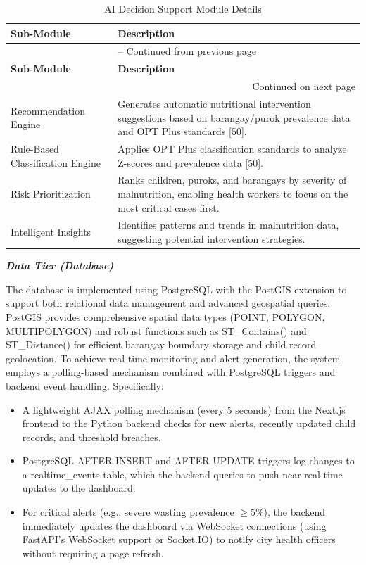 \documentclass[12pt, a4paper]{report}
\begin{document}
\vspace{0.3cm}
\begin{longtable}{p{3.5cm} p{10.5cm}}
    \caption{AI Decision Support Module Details} \label{tab:ai_modules} \\
    \toprule
    \textbf{Sub-Module} & \textbf{Description} \\
    \midrule
    \endfirsthead
    \multicolumn{2}{c}{{\tablename\ \thetable{} -- Continued from previous page}} \\
    \toprule
    \textbf{Sub-Module} & \textbf{Description} \\
    \midrule
    \endhead
    \midrule
    \multicolumn{2}{r}{{Continued on next page}} \\
    \endfoot
    \bottomrule
    \endlastfoot
    Recommendation Engine & Generates automatic nutritional intervention suggestions based on barangay/purok prevalence data and OPT Plus standards [50]. \\
    \addlinespace
    Rule-Based Classification Engine & Applies OPT Plus classification standards to analyze Z-scores and prevalence data [50]. \\
    \addlinespace
    Risk Prioritization & Ranks children, puroks, and barangays by severity of malnutrition, enabling health workers to focus on the most critical cases first. \\
    \addlinespace
    Intelligent Insights & Identifies patterns and trends in malnutrition data, suggesting potential intervention strategies. \\
\end{longtable}
\vspace{0.3cm}

\noindent \textbf{\textit{Data Tier (Database)}}

The database is implemented using PostgreSQL with the PostGIS extension to support both relational data management and advanced geospatial queries. PostGIS provides comprehensive spatial data types (POINT, POLYGON, MULTIPOLYGON) and robust functions such as ST\_Contains() and ST\_Distance() for efficient barangay boundary storage and child record geolocation. To achieve real-time monitoring and alert generation, the system employs a polling-based mechanism combined with PostgreSQL triggers and backend event handling. Specifically:

\begin{itemize}
    \item A lightweight AJAX polling mechanism (every 5 seconds) from the Next.js frontend to the Python backend checks for new alerts, recently updated child records, and threshold breaches.
    \item PostgreSQL AFTER INSERT and AFTER UPDATE triggers log changes to a realtime\_events table, which the backend queries to push near-real-time updates to the dashboard.
    \item For critical alerts (e.g., severe wasting prevalence \(\geq 5\%\)), the backend immediately updates the dashboard via WebSocket connections (using FastAPI's WebSocket support or Socket.IO) to notify city health officers without requiring a page refresh.
\end{itemize}
\end{document}
